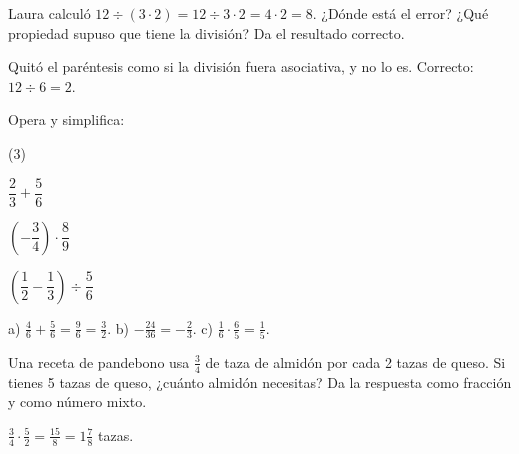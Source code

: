 \documentclass[11pt]{article}
\begin{document}
\begin{preguntas}
\pregunta[1] Laura calculó $12 \div (3 \cdot 2) = 12 \div 3 \cdot 2 = 4 \cdot 2 = 8$.
¿Dónde está el error? ¿Qué propiedad supuso que tiene la división? Da el resultado correcto.
\begin{solucion}
Quitó el paréntesis como si la división fuera asociativa, y no lo es. Correcto:
$12 \div 6 = 2$.
\end{solucion}

\pregunta[1] Opera y simplifica:
\begin{opciones*}(3)
  \item $\dfrac{2}{3} + \dfrac{5}{6}$
  \item $\left(-\dfrac{3}{4}\right) \cdot \dfrac{8}{9}$
  \item $\left(\dfrac{1}{2} - \dfrac{1}{3}\right) \div \dfrac{5}{6}$
\end{opciones*}
\begin{solucion}[3cm]
a) $\frac{4}{6} + \frac{5}{6} = \frac{9}{6} = \frac{3}{2}$. b) $-\frac{24}{36} = -\frac{2}{3}$.
c) $\frac{1}{6} \cdot \frac{6}{5} = \frac{1}{5}$.
\end{solucion}

\pregunta[1] Una receta de pandebono usa $\frac{3}{4}$ de taza de almidón por cada 2 tazas de
queso. Si tienes 5 tazas de queso, ¿cuánto almidón necesitas? Da la respuesta como fracción y
como número mixto.
\espacio{3cm}
\begin{solucion}
$\frac{3}{4} \cdot \frac{5}{2} = \frac{15}{8} = 1\frac{7}{8}$ tazas.
\end{solucion}

\end{preguntas}
\end{document}
